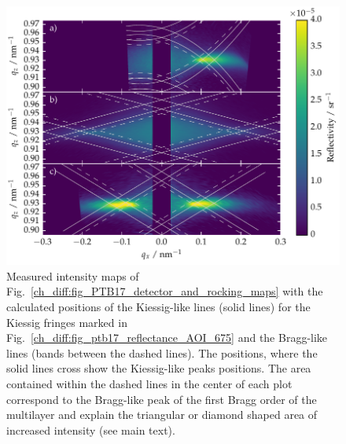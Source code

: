 \begin{figure}[htbp]
        \includegraphics[width=\textwidth]{img/kiessig_like_peaks_diffuse_map} \caption[Calculated positions of the Kiessig-like lines in the reciprocal space maps.]{Measured intensity maps of Fig.~\ref{ch_diff:fig_PTB17_detector_and_rocking_maps} with the calculated positions of the Kiessig-like lines (solid lines) for the Kiessig fringes marked in Fig.~\ref{ch_diff:fig_ptb17_reflectance_AOI_675} and the Bragg-like lines (bands between the dashed lines). The positions, where the solid lines cross show the Kiessig-like peaks positions. The area contained within the dashed lines in the center of each plot correspond to the Bragg-like peak of the first Bragg order of the multilayer and explain the triangular or diamond shaped area of increased intensity (see main text).} \label{ch_diff:fig_kiessig_like_peaks_diffuse_map} 
\end{figure}

